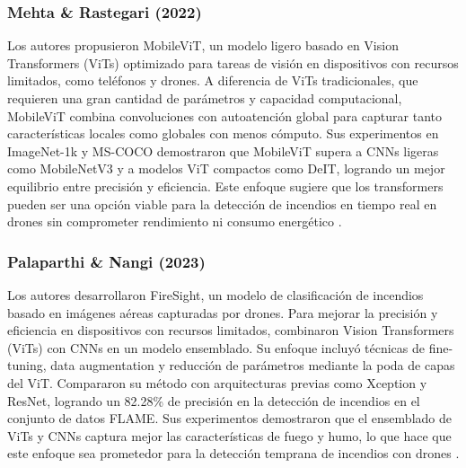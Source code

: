 \subsubsection{Mehta \& Rastegari (2022)}
Los autores propusieron MobileViT, un modelo ligero basado en Vision Transformers (ViTs)
optimizado para tareas de visión en dispositivos con recursos limitados, como teléfonos y
drones. A diferencia de ViTs tradicionales, que requieren una gran cantidad de parámetros y
capacidad computacional, MobileViT combina convoluciones con autoatención global para
capturar tanto características locales como globales con menos cómputo. Sus experimentos en
ImageNet-1k y MS-COCO demostraron que MobileViT supera a CNNs ligeras como MobileNetV3 y a
modelos ViT compactos como DeIT, logrando un mejor equilibrio entre precisión y eficiencia.
Este enfoque sugiere que los transformers pueden ser una opción viable para la detección
de incendios en tiempo real en drones sin comprometer rendimiento ni consumo
energético \cite{mobilevit2022}.

\subsubsection{Palaparthi \& Nangi (2023)}
Los autores desarrollaron FireSight, un modelo de clasificación de incendios basado
en imágenes aéreas capturadas por drones. Para mejorar la precisión y eficiencia en
dispositivos con recursos limitados, combinaron Vision Transformers (ViTs) con CNNs
en un modelo ensemblado. Su enfoque incluyó técnicas de fine-tuning, data augmentation
y reducción de parámetros mediante la poda de capas del ViT. Compararon su método con
arquitecturas previas como Xception y ResNet, logrando un 82.28\% de precisión en la
detección de incendios en el conjunto de datos FLAME. Sus experimentos demostraron que
el ensemblado de ViTs y CNNs captura mejor las características de fuego y humo, lo que
hace que este enfoque sea prometedor para la detección temprana de
incendios con drones \cite{firesight2023}.



